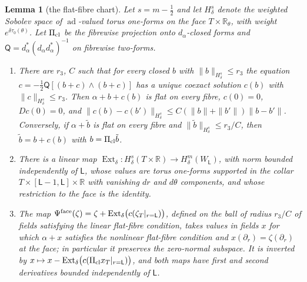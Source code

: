 \documentclass[11pt]{amsart}
\newtheorem{lemma}[theorem]{Lemma}
\theoremstyle{definition}
\theoremstyle{remark}
\theoremstyle{plain}
\numberwithin{equation}{section}
\newcommand{\RR}{\mathbb{R}}
\newcommand{\ad}{\operatorname{ad}}
\begin{document}
\begin{lemma}[the flat-fibre chart]\label{lem:face-chart}
Let $s=m-\frac12$ and let $H^s_\delta$ denote the weighted Sobolev space of
$\ad$-valued torus one-forms on the face $T\times\RR_\theta$, with weight $e^{\delta\tau_0(\theta)}$.
Let $\Pi_{\rm cl}$ be the fibrewise projection onto $d_\alpha$-closed forms and
$\mathsf Q=d_\alpha^*(d_\alpha d_\alpha^*)^{-1}$ on fibrewise two-forms.
\begin{enumerate}[label=(\alph*)]
\item There are $r_3$, $C$ such that for every closed $b$ with $\|b\|_{H^s_\delta}\le r_3$ the
  equation $c=-\tfrac12\mathsf Q[(b+c)\wedge(b+c)]$ has a unique coexact solution $c(b)$
  with $\|c\|_{H^s_\delta}\le r_3$. Then $\alpha+b+c(b)$ is flat on every fibre, $c(0)=0$,
  $Dc(0)=0$, and $\|c(b)-c(b')\|_{H^s_\delta}\le C(\|b\|+\|b'\|)\|b-b'\|$. Conversely, if
  $\alpha+\tilde b$ is flat on every fibre and $\|\tilde b\|_{H^s_\delta}\le r_3/C$, then
  $\tilde b=b+c(b)$ with $b=\Pi_{\rm cl}\tilde b$.
\item There is a linear map $\operatorname{Ext}_\delta\colon H^s_\delta(T\times\RR)\to H^m_\delta(W_\mathsf L)$,
  with norm bounded independently of $\mathsf L$, whose values are torus one-forms
  supported in the collar $T\times[\mathsf L-1,\mathsf L]\times\RR$ with vanishing $dr$ and $d\theta$
  components, and whose restriction to the face is the identity.
\item The map $\Psi^{\rm face}(\zeta)=\zeta+\operatorname{Ext}_\delta\bigl(c(\zeta_T|_{r=\mathsf L})\bigr)$,
  defined on the ball of radius $r_3/C$ of fields satisfying the linear flat-fibre
  condition, takes values in fields $x$ for which $\alpha+x$ satisfies the nonlinear
  flat-fibre condition and $x(\partial_r)=\zeta(\partial_r)$ at the face;
  in particular it preserves the zero-normal subspace. It is inverted by
  $x\mapsto x-\operatorname{Ext}_\delta\bigl(c(\Pi_{\rm cl}x_T|_{r=\mathsf L})\bigr)$, and both maps have
  first and second derivatives bounded independently of $\mathsf L$.
\end{enumerate}
\end{lemma}
\end{document}
